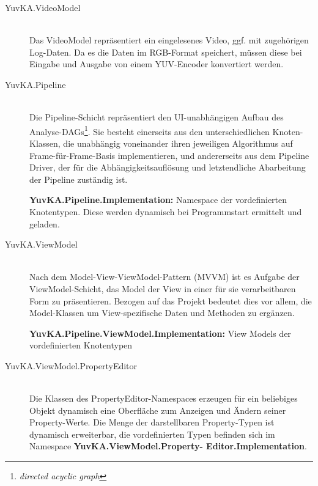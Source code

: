 \begin{description}
	\item[YuvKA.VideoModel]~\\
	Das VideoModel repräsentiert ein eingelesenes Video, ggf. mit zugehörigen Log-Daten. Da es die Daten im RGB-Format speichert, müssen diese bei Eingabe und Ausgabe von einem YUV-Encoder konvertiert werden.

	\item[YuvKA.Pipeline]~\\
	Die Pipeline-Schicht repräsentiert den UI-unabhängigen Aufbau des Analyse-DAGs\footnote{\emph{directed acyclic graph}}. Sie besteht einerseits aus den unterschiedlichen Knoten-Klassen, die unabhängig voneinander ihren jeweiligen Algorithmus auf Frame-für-Frame-Basis implementieren, und andererseits aus dem Pipeline Driver, der für die Abhängigkeitsauflösung und letztendliche Abarbeitung der Pipeline zuständig ist.

	\textbf{YuvKA.Pipeline.Implementation:} Namespace der vordefinierten Knotentypen. Diese werden dynamisch bei Programmstart ermittelt und geladen.
	
	\item[YuvKA.ViewModel]~\\
	Nach dem Model-View-ViewModel-Pattern (MVVM) ist es Aufgabe der ViewModel-Schicht, das Model der View in einer für sie verarbeitbaren Form zu präsentieren. Bezogen auf das Projekt bedeutet dies vor allem, die Model-Klassen um View-spezifische Daten und Methoden zu ergänzen.

	\textbf{YuvKA.Pipeline.ViewModel.Implementation:} View Models der vordefinierten Knotentypen
	
	\item[YuvKA.ViewModel.PropertyEditor]~\\
	Die Klassen des PropertyEditor-Namespaces erzeugen für ein beliebiges Objekt dynamisch eine Oberfläche zum Anzeigen und Ändern seiner Property-Werte. Die Menge der darstellbaren Property-Typen ist dynamisch erweiterbar, die vordefinierten Typen befinden sich im Namespace \textbf{YuvKA.ViewModel.Property- Editor.Implementation}.

\end{description}



